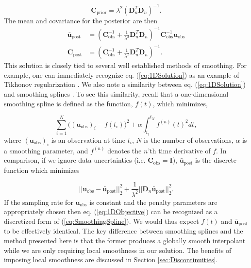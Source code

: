 \documentclass[10pt,a4paper]{article}
\begin{document}
\begin{equation}\label{eq:ExplicitPrior1D}
\mathbf{C_\mathrm{prior}} = \lambda^2(\mathbf{D}_n^T\mathbf{D}_n)^{-1}.
\end{equation}
The mean and covariance for the posterior are then 
\begin{equation}\label{eq:1DSolution}
\begin{split}
\mathbf{\bar{u}}_\mathrm{post} &= (\mathbf{C}_\mathrm{obs}^{-1} +   
                   \frac{1}{\lambda^2}\mathbf{D}_n^T\mathbf{D}_n)^{-1}\mathbf{C}_\mathrm{obs}^{-1}
                   \mathbf{u}_\mathrm{obs}
\\
\mathbf{C}_\mathrm{post} &= (\mathbf{C}_\mathrm{obs}^{-1} +   
                            \frac{1}{\lambda^2}\mathbf{D}_n^T\mathbf{D}_n)^{-1}.
\end{split}
\end{equation}
This solution is closely tied to several well established methods of smoothing.  For example, one can immediately recognize eq. (\ref{eq:1DSolution}) as an example of Tikhonov regularization \citep{Tikhonov1978}. We also note a similarity between eq. (\ref{eq:1DSolution}) and smoothing splines \citep{Wahba1990}.  To see this similarity, recall that a one-dimensional smoothing spline is defined as the function, $f(t)$, which minimizes,

\begin{equation}\label{eq:SmoothingSpline}
\sum_{i=1}^N \big((\mathbf{u_\mathrm{obs}})_i - f(t_i)\big)^2 + \alpha \int_{t_1}^{t_N} f^{(n)}(t)^2 dt,
\end{equation}
where $(\mathbf{u_\mathrm{obs}})_i$ is an observation at time $t_i$, $N$ is the number of observations, $\alpha$ is a smoothing parameter, and $f^{(n)}$ denotes the $n$'th time derivative of $f$.
In comparison, if we ignore data uncertainties (i.e. $\mathbf{C}_\mathrm{obs}=\mathbf{I}$), $\mathbf{\bar{u}}_\mathrm{post}$ is the discrete function which minimizes  

\begin{equation}\label{eq:1DObjective}
||\mathbf{u}_\mathrm{obs} - \mathbf{\bar{u}}_\mathrm{post}||_2^2 + \frac{1}{\lambda^2}||\mathbf{D}_n\mathbf{\bar{u}}_\mathrm{post}||_2^2.
\end{equation} 
If the sampling rate for $\mathbf{u}_\mathrm{obs}$ is constant and the penalty parameters are appropriately chosen then eq. (\ref{eq:1DObjective}) can be recognized as a discretized form of (\ref{eq:SmoothingSpline}).  We would thus expect $f(t)$ and $\mathbf{\bar{u}}_\mathrm{post}$ to be effectively identical.  The key difference between smoothing splines and the method presented here is that the former produces a globally smooth interpolant while we are only requiring local smoothness in our solution.  The benefits of imposing local smoothness are discussed in Section \ref{sec:Discontinuities}. 
\end{document}
